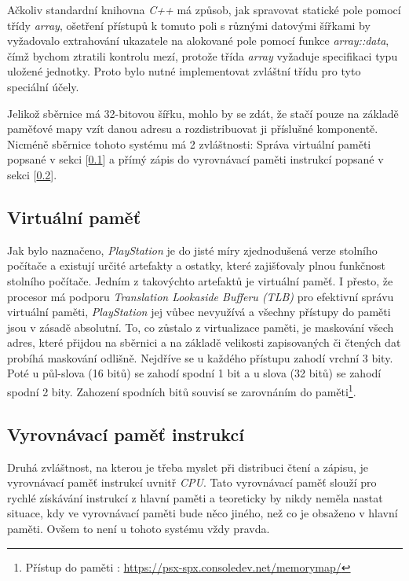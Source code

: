Ačkoliv standardní knihovna \textit{C++} má způsob, jak spravovat statické pole pomocí třídy \textit{array}, ošetření přístupů k tomuto poli s různými datovými šířkami by vyžadovalo extrahování ukazatele na alokované pole pomocí funkce \textit{array::data}, čímž bychom ztratili kontrolu mezí, protože třída \textit{array} vyžaduje specifikaci typu uložené jednotky. Proto bylo nutné implementovat zvláštní třídu pro tyto speciální účely.

Jelikož sběrnice má 32-bitovou šířku, mohlo by se zdát, že stačí pouze na základě paměťové mapy vzít danou 
adresu a rozdistribuovat ji příslušné komponentě. Nicméně sběrnice tohoto systému má 2 zvláštnosti: 
Správa virtuální paměti popsané v sekci [\ref{virtual-mem}] a přímý zápis do vyrovnávací paměti instrukcí popsané v sekci [\ref{icache-direct}].

\subsection{Virtuální paměť} \label{virtual-mem}

Jak bylo naznačeno, \textit{PlayStation} je do jisté míry zjednodušená verze 
stolního počítače a existují určité artefakty a ostatky, které zajišťovaly plnou funkčnost stolního počítače. 
Jedním z takovýchto artefaktů je virtuální paměť. I přesto, že procesor má 
podporu \textit{Translation Lookaside Bufferu (TLB)} pro efektivní správu virtuální paměti, \textit{PlayStation} jej vůbec nevyužívá a všechny přístupy do paměti jsou v zásadě absolutní.
To, co zůstalo z virtualizace paměti, je maskování všech adres, které přijdou na sběrnici a na základě velikosti zapisovaných či čtených dat probíhá maskování odlišně.
Nejdříve se u každého přístupu zahodí vrchní 3 bity. 
Poté u půl-slova (16 bitů) se zahodí spodní 1 bit a u slova (32 bitů) se zahodí spodní 2 bity. 
Zahození spodních bitů souvisí se zarovnáním do paměti\footnote{Přístup do paměti \cite{PSXSpec}: \url{https://psx-spx.consoledev.net/memorymap/}}.

\subsection{Vyrovnávací paměť instrukcí} \label{icache-direct}

Druhá zvláštnost, na kterou je třeba myslet při distribuci čtení a zápisu, je vyrovnávací paměť instrukcí uvnitř \textit{CPU}. 
Tato vyrovnávací paměť slouží pro rychlé získávání instrukcí z hlavní paměti a teoreticky by nikdy 
neměla nastat situace, kdy ve vyrovnávací paměti bude něco jiného, než co je obsaženo v hlavní paměti. 
Ovšem to není u tohoto systému vždy pravda.

